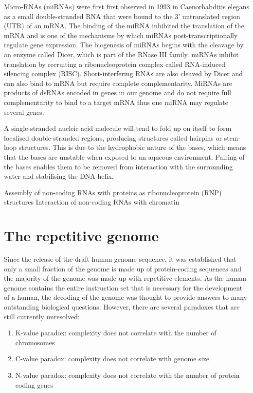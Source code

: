 Micro-RNAs (miRNAs) were first first observed in 1993 in Caenorhabditis elegans\cite{pmid8252621} as a small double-stranded RNA that were bound to the 3' untranslated region (UTR) of an mRNA. The binding of the miRNA inhibited the translation of the mRNA and is one of the mechanisms by which miRNAs post-transcriptionally regulate gene expression. The biogenesis of miRNAs begins with the cleavage by an enzyme called Dicer\cite{pmid11201747}, which is part of the RNase III family. miRNAs inhibit translation by recruiting a ribonucleoprotein complex called RNA-induced silencing complex (RISC). Short-interfering RNAs are also cleaved by Dicer and can also bind to mRNA but require complete complementarity. MiRNAs are products of dsRNAs encoded in genes in our genome and do not require full complementarity to bind to a target mRNA thus one miRNA may regulate several genes.

A single-stranded nucleic acid molecule will tend to fold up on itself to form localised double-stranded regions, producing structures called hairpins or stem-loop structures. This is due to the hydrophobic nature of the bases, which means that the bases are unstable when exposed to an aqueous environment. Pairing of the bases enables them to be removed from interaction with the surrounding water and stabilising the DNA helix.

Assembly of non-coding RNAs with proteins as ribonucleoprotein (RNP) structures
Interaction of non-coding RNAs with chromatin

\section{The repetitive genome}

Since the release of the draft human genome sequence\cite{venter2001sequence, lander2001initial}, it was established that only a small fraction of the genome is made up of protein-coding sequences and the majority of the genome was made up with repetitive elements. As the human genome contains the entire instruction set that is necessary for the development of a human, the decoding of the genome was thought to provide answers to many outstanding biological questions. However, there are several paradoxes that are still currently unresolved:

\begin{enumerate}
   \item K-value paradox: complexity does not correlate with the number of chromosomes
   \item C-value paradox: complexity does not correlate with genome size
   \item N-value paradox: complexity does not correlate with the number of protein coding genes
\end{enumerate}

